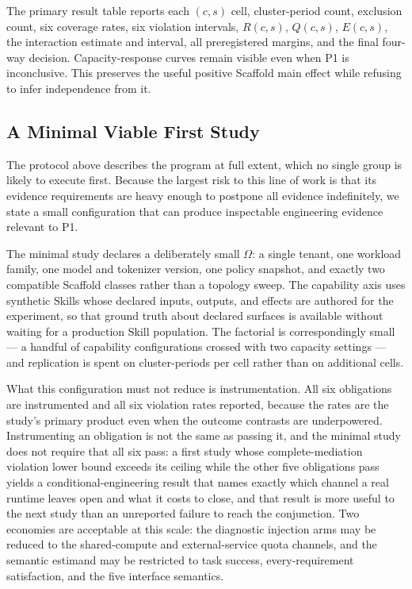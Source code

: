 \documentclass[11pt]{article}
\begin{document}
The primary result table reports each $(c,s)$ cell, cluster-period count, exclusion count, six coverage rates, six violation intervals, $R(c,s)$, $Q(c,s)$, $E(c,s)$, the interaction estimate and interval, all preregistered margins, and the final four-way decision. Capacity-response curves remain visible even when P1 is inconclusive. This preserves the useful positive Scaffold main effect while refusing to infer independence from it.

\subsection{A Minimal Viable First Study}
\label{sec:eval-minimal}

The protocol above describes the program at full extent, which no single group is likely to execute first. Because the largest risk to this line of work is that its evidence requirements are heavy enough to postpone all evidence indefinitely, we state a small configuration that can produce inspectable engineering evidence relevant to P1.

The minimal study declares a deliberately small $\Omega$: a single tenant, one workload family, one model and tokenizer version, one policy snapshot, and exactly two compatible Scaffold classes rather than a topology sweep. The capability axis uses synthetic Skills whose declared inputs, outputs, and effects are authored for the experiment, so that ground truth about declared surfaces is available without waiting for a production Skill population. The factorial is correspondingly small --- a handful of capability configurations crossed with two capacity settings --- and replication is spent on cluster-periods per cell rather than on additional cells.

What this configuration must not reduce is instrumentation. All six obligations are instrumented and all six violation rates reported, because the rates are the study's primary product even when the outcome contrasts are underpowered. Instrumenting an obligation is not the same as passing it, and the minimal study does not require that all six pass: a first study whose complete-mediation violation lower bound exceeds its ceiling while the other five obligations pass yields a conditional-engineering result that names exactly which channel a real runtime leaves open and what it costs to close, and that result is more useful to the next study than an unreported failure to reach the conjunction. Two economies are acceptable at this scale: the diagnostic injection arms may be reduced to the shared-compute and external-service quota channels, and the semantic estimand may be restricted to task success, every-requirement satisfaction, and the five interface semantics.
\end{document}
